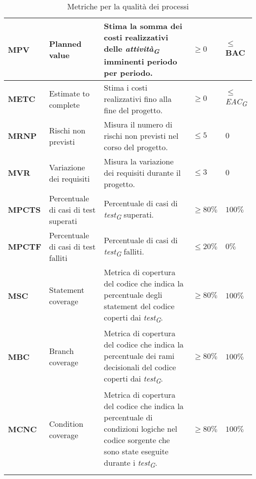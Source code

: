 \begin{longtable}{|C{1.9cm}|L{4cm}|L{4cm}|L{2.2cm}|L{2.1cm}|}
\textbf{MPV} & Planned value & Stima la somma dei costi realizzativi delle \textit{attività}\textsubscript{\textit{G}} imminenti periodo per periodo. & $\geq 0 $ & $ \leq$ BAC \\
\hline

\textbf{METC} & Estimate to complete & Stima i costi realizzativi fino alla fine del progetto. & $\geq 0 $ & $ \leq$ \textit{EAC}\textsubscript{\textit{G}} \\
\hline

\textbf{MRNP} & Rischi non previsti & Misura il numero di rischi non previsti nel corso del progetto. & $\leq 5$ & $0$ \\
\hline

\textbf{MVR} & Variazione dei requisiti & Misura la variazione dei requisiti durante il progetto. & $\leq 3$ & $0$ \\
\hline

\textbf{MPCTS} & Percentuale di casi di test superati & Percentuale di casi di \textit{test}\textsubscript{\textit{G}} superati. & $\geq 80\%$ & $100\%$ \\
\hline

\textbf{MPCTF} & Percentuale di casi di test falliti & Percentuale di casi di \textit{test}\textsubscript{\textit{G}} falliti. & $\leq 20\%$ & $0\%$ \\
\hline

\textbf{MSC} & Statement coverage & Metrica di copertura del codice che indica la percentuale degli statement del codice coperti dai \textit{test}\textsubscript{\textit{G}}. & $\geq 80\%$ & $100\%$ \\
\hline

\textbf{MBC} & Branch coverage & Metrica di copertura del codice che indica la percentuale dei rami decisionali del codice coperti dai \textit{test}\textsubscript{\textit{G}}. & $\geq 80\%$ & $100\%$ \\
\hline

\textbf{MCNC} & Condition coverage & Metrica di copertura del codice che indica la percentuale di condizioni logiche nel codice sorgente che sono state eseguite durante i \textit{test}\textsubscript{\textit{G}}. & $\geq 80\%$ & $100\%$ \\
\hline

\caption{Metriche per la qualità dei processi}
\label{tab:qualità_processo_progetto}
\end{longtable}

\pagebreak